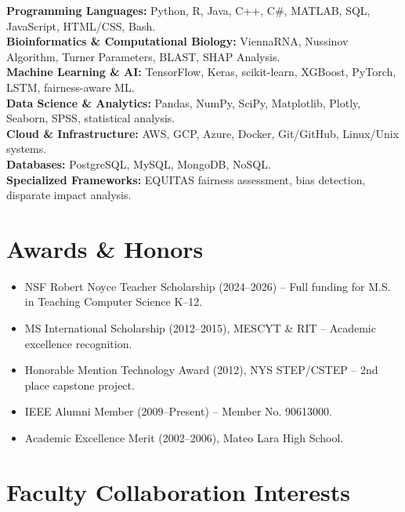 \documentclass[11pt,letterpaper]{article}
\begin{document}
\textbf{Programming Languages:} Python, R, Java, C++, C\#, MATLAB, SQL, JavaScript, HTML/CSS, Bash.\\
\textbf{Bioinformatics \& Computational Biology:} ViennaRNA, Nussinov Algorithm, Turner Parameters, BLAST, SHAP Analysis.\\
\textbf{Machine Learning \& AI:} TensorFlow, Keras, scikit-learn, XGBoost, PyTorch, LSTM, fairness-aware ML.\\
\textbf{Data Science \& Analytics:} Pandas, NumPy, SciPy, Matplotlib, Plotly, Seaborn, SPSS, statistical analysis.\\
\textbf{Cloud \& Infrastructure:} AWS, GCP, Azure, Docker, Git/GitHub, Linux/Unix systems.\\
\textbf{Databases:} PostgreSQL, MySQL, MongoDB, NoSQL.\\
\textbf{Specialized Frameworks:} EQUITAS fairness assessment, bias detection, disparate impact analysis.

\section{Awards \& Honors}

\begin{itemize}
    \item NSF Robert Noyce Teacher Scholarship (2024–2026) – Full funding for M.S. in Teaching Computer Science K–12.
    \item MS International Scholarship (2012–2015), MESCYT \& RIT – Academic excellence recognition.
    \item Honorable Mention Technology Award (2012), NYS STEP/CSTEP – 2nd place capstone project.
    \item IEEE Alumni Member (2009–Present) – Member No. 90613000.
    \item Academic Excellence Merit (2002–2006), Mateo Lara High School.
\end{itemize}

\section{Faculty Collaboration Interests}
\end{document}

